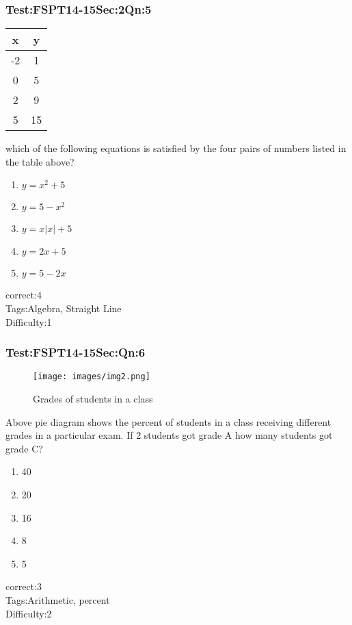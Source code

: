 \documentclass[]{beamer}
\begin{document}
    \begin{frame}
	    \frametitle{Test:FSPT14-15\hspace{2mm}Sec:2\hspace{2mm}Qn:5}
	    \begin{center}
	    	\begin{tabular}{|c|c|}
				\hline
				x & y\\
				\hline
				-2 & 1\\
				0 & 5\\
				2 & 9\\
				5 & 15\\
				\hline
			\end{tabular}
	    \end{center}
which of the following equations is satisfied by the four pairs of numbers listed in the table above?
	    \begin{enumerate}
	        \item
				$y=x^2+5$	            	
	        \item
	            $y=5-x^2$
	        \item
	            $y=x|x|+5$
	        \item
	            $y=2x+5$
	        \item
	            $y=5-2x$
	    \end{enumerate}
	    correct:4  \\   
	    Tags:Algebra, Straight Line    \\
	    Difficulty:1   \\
    \end{frame}
    \begin{frame}
	    \frametitle{Test:FSPT14-15\hspace{2mm}Sec:\hspace{2mm}Qn:6}
	       \begin{figure}
	       \begin{center}
	       \texttt{[image: images/img2.png]}
	       \end{center}
	       {Grades of students in a class}
	       \end{figure}
	      Above pie diagram shows the percent of students in a class receiving different grades in a particular exam. If 2 students got grade A how many students got grade C?
	    \begin{enumerate}
	        \item
	            40	
	        \item
	            20
	        \item
	            16
	        \item
	            8
	        \item
	            5
	    \end{enumerate}
	    correct:3  \\   
	    Tags:Arithmetic, percent    \\
	    Difficulty:2   \\
    \end{frame}
\end{document}
